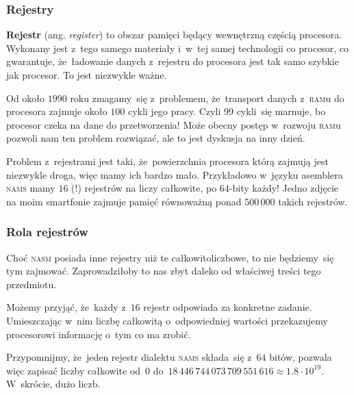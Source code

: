 \documentclass[10pt,t]{beamer}
\begin{document}
\begin{frame}
  \frametitle{Rejestry}


  \textbf{Rejestr} (ang. \textit{register}) to obszar pamięci będący
  \alert{wewnętrzną} częścią procesora. Wykonany jest z~tego samego
  materiały i~w~tej samej technologii co procesor, co gwarantuje,
  że~ładowanie danych z~rejestru do procesora jest tak samo szybkie jak
  procesor. \alert{To jest niezwykle ważne.}

  Od około $1990$ roku zmagamy~się z~problemem, że~transport danych
  z~\textsc{ram}u do procesora zajmuje około $100$ cykli jego pracy.
  Czyli $99$ cykli~się \alert{marnuje}, bo procesor czeka na dane do
  przetworzenia! Może obecny postęp w~rozwoju \textsc{ram}u pozwoli nam ten
  problem rozwiązać, ale to jest dyskusja na inny dzień.

  Problem z~rejestrami jest taki, że~powierzchnia procesora którą zajmują
  jest niezwykle droga, więc mamy ich \alert{bardzo mało}.
  Przykładowo w~języku asemblera \textsc{nams} mamy $16$ (!) rejestrów
  na liczy całkowite, po $64$-bity każdy! Jedno zdjęcie na moim smartfonie
  zajmuje pamięć równoważną ponad $500 \, 000$ takich rejestrów.

\end{frame}





\begin{frame}
  \frametitle{Rola rejestrów}


  Choć \textsc{nasm} posiada inne rejestry niż te całkowitoliczbowe, to nie
  będziemy~się tym zajmować. Zaprowadziłoby to nas zbyt daleko od właściwej
  treści tego przedmiotu.

  Możemy przyjąć, że~każdy z~$16$ rejestr odpowiada za konkretne zadanie.
  Umieszczając w~nim liczbę całkowitą o~odpowiedniej wartości przekazujemy
  procesorowi informację o~tym co ma zrobić.

  Przypomnijmy, że~jeden rejestr dialektu \textsc{nams} składa~się z~$64$
  bitów, pozwala więc zapisać liczby całkowite od~$0$
  do~$18 \, 446 \, 744 \, 073 \, 709 \, 551 \, 616 \approx 1.8 \cdot 10^{ 19 }$.
  W~skrócie, dużo liczb.

\end{frame}
\end{document}
